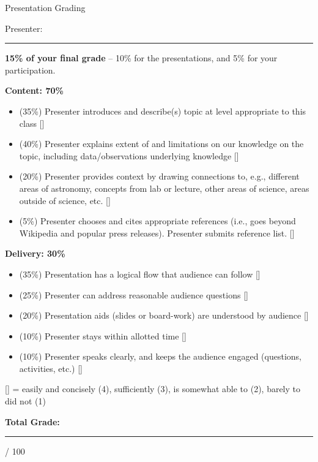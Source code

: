 \documentclass[11pt]{article}
\begin{document}
\begin{center}
\huge{Presentation Grading}
\end{center}

\bigskip
\bigskip

\noindent
Presenter: \rule{10cm}{1pt}

\medskip \noindent
\textbf{15\% of your final grade} -- 10\% for the presentations, and 5\% for your participation.

\medskip \noindent
\textbf{Content: 70\%}
\begin{itemize}
    \item (35\%) Presenter introduces and describe(s) topic at level appropriate to this class [\underline{\hspace{5mm}}]
    \item (40\%) Presenter explains extent of and limitations on our knowledge on the topic, including data/observations underlying knowledge [\underline{\hspace{5mm}}]
    \item (20\%) Presenter provides context by drawing connections to, e.g., different areas of astronomy, concepts from lab or
    lecture, other areas of science, areas outside of science, etc. [\underline{\hspace{5mm}}]
    \item (5\%) Presenter chooses and cites appropriate references (i.e., goes beyond Wikipedia and popular press releases).  Presenter submits reference list. [\underline{\hspace{5mm}}]
\end{itemize} 

\noindent
\textbf{Delivery: 30\%}
\begin{itemize}
    \item (35\%) Presentation has a logical flow that audience can follow [\underline{\hspace{5mm}}]
    \item (25\%) Presenter can address reasonable audience questions [\underline{\hspace{5mm}}]
    \item (20\%) Presentation aids (slides or board-work) are understood by audience [\underline{\hspace{5mm}}]
    \item (10\%) Presenter stays within allotted time [\underline{\hspace{5mm}}]
    \item (10\%) Presenter speaks clearly, and keeps the audience engaged (questions, activities, etc.) [\underline{\hspace{5mm}}]
\end{itemize}
{\small [\underline{\hspace{5mm}}] = easily and concisely (4), sufficiently (3), is somewhat able to (2), barely to did not (1)}


\bigskip \bigskip \noindent
\textbf{Total Grade:} \rule{1cm}{1pt} / 100
\end{document}
